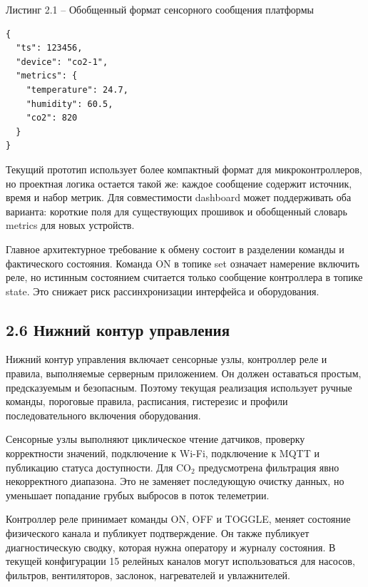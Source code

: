 \documentclass[a4paper,14pt]{extarticle}
\renewcommand{\texttt}[1]{\textnormal{#1}}
\begin{document}
Листинг 2.1 -- Обобщенный формат сенсорного сообщения платформы

\par\noindent\begin{minipage}{\linewidth}
\begin{verbatim}
{
  "ts": 123456,
  "device": "co2-1",
  "metrics": {
    "temperature": 24.7,
    "humidity": 60.5,
    "co2": 820
  }
}
\end{verbatim}
\end{minipage}\par

Текущий прототип использует более компактный формат для
микроконтроллеров, но проектная логика остается такой же: каждое
сообщение содержит источник, время и набор метрик. Для совместимости
dashboard может поддерживать оба варианта: короткие поля для
существующих прошивок и обобщенный словарь \texttt{metrics} для новых
устройств.

Главное архитектурное требование к обмену состоит в разделении команды и
фактического состояния. Команда \texttt{ON} в топике \texttt{set}
означает намерение включить реле, но истинным состоянием считается
только сообщение контроллера в топике \texttt{state}. Это снижает риск
рассинхронизации интерфейса и оборудования.

\hypertarget{ux43dux438ux436ux43dux438ux439-ux43aux43eux43dux442ux443ux440-ux443ux43fux440ux430ux432ux43bux435ux43dux438ux44f}{%
\subsection{2.6 Нижний контур
управления}\label{ux43dux438ux436ux43dux438ux439-ux43aux43eux43dux442ux443ux440-ux443ux43fux440ux430ux432ux43bux435ux43dux438ux44f}}

Нижний контур управления включает сенсорные узлы, контроллер реле и
правила, выполняемые серверным приложением. Он должен оставаться
простым, предсказуемым и безопасным. Поэтому текущая реализация
использует ручные команды, пороговые правила, расписания, гистерезис и
профили последовательного включения оборудования.

Сенсорные узлы выполняют циклическое чтение датчиков, проверку
корректности значений, подключение к Wi-Fi, подключение к MQTT и
публикацию статуса доступности. Для CO\(_2\) предусмотрена фильтрация
явно некорректного диапазона. Это не заменяет последующую очистку
данных, но уменьшает попадание грубых выбросов в поток телеметрии.

Контроллер реле принимает команды \texttt{ON}, \texttt{OFF} и
\texttt{TOGGLE}, меняет состояние физического канала и публикует
подтверждение. Он также публикует диагностическую сводку, которая нужна
оператору и журналу состояния. В текущей конфигурации 15 релейных
каналов могут использоваться для насосов, фильтров, вентиляторов,
заслонок, нагревателей и увлажнителей.
\end{document}
